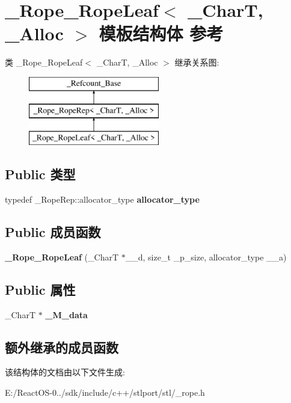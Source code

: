 \hypertarget{struct___rope___rope_leaf}{}\section{\+\_\+\+Rope\+\_\+\+Rope\+Leaf$<$ \+\_\+\+CharT, \+\_\+\+Alloc $>$ 模板结构体 参考}
\label{struct___rope___rope_leaf}
类 \+\_\+\+Rope\+\_\+\+Rope\+Leaf$<$ \+\_\+\+CharT, \+\_\+\+Alloc $>$ 继承关系图\+:\begin{figure}[H]
\begin{center}
\leavevmode
\includegraphics[height=3.000000cm]{struct___rope___rope_leaf}
\end{center}
\end{figure}
\subsection*{Public 类型}
\begin{DoxyCompactItemize}
\item 
\mbox{\label{struct___rope___rope_leaf_afb40892870847a71f5b90de70b6421c8}} 
typedef \+\_\+\+Rope\+Rep\+::allocator\+\_\+type {\bfseries allocator\+\_\+type}
\end{DoxyCompactItemize}
\subsection*{Public 成员函数}
\begin{DoxyCompactItemize}
\item 
\mbox{\label{struct___rope___rope_leaf_ac6db030f2b2ea39a151549ed7cf2885f}} 
{\bfseries \+\_\+\+Rope\+\_\+\+Rope\+Leaf} (\+\_\+\+CharT $\ast$\+\_\+\+\_\+d, size\+\_\+t \+\_\+p\+\_\+size, allocator\+\_\+type \+\_\+\+\_\+a)
\end{DoxyCompactItemize}
\subsection*{Public 属性}
\begin{DoxyCompactItemize}
\item 
\mbox{\label{struct___rope___rope_leaf_aa88e779af13c0007b32c50c2302e209e}} 
\+\_\+\+CharT $\ast$ {\bfseries \+\_\+\+M\+\_\+data}
\end{DoxyCompactItemize}
\subsection*{额外继承的成员函数}


该结构体的文档由以下文件生成\+:\begin{DoxyCompactItemize}
\item 
E\+:/\+React\+O\+S-\/0../sdk/include/c++/stlport/stl/\+\_\+rope.\+h\end{DoxyCompactItemize}
